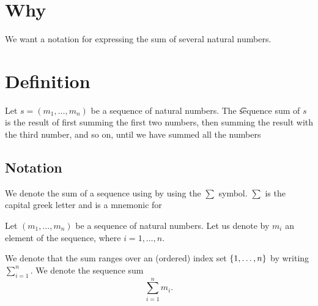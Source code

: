 

\section*{Why}

We want a notation for expressing the sum of several natural numbers.

\section*{Definition}

Let $s = (m_1, \dots , m_n)$ be a sequence of natural numbers. The \t{sequence sum} of $s$ is the result of first summing the first two numbers, then summing the result with the third number, and so on, until we have summed all the numbers

\subsection*{Notation}

We denote the sum of a sequence using by using the $\sum$ symbol. $\sum$ is the capital greek letter  and is a mnemonic for 

Let $(m_1, \dots , m_n)$ be a sequence of natural numbers.
Let us denote by $m_i$ an element of the sequence, where $i = 1, \dots , n$.

We denote that the sum ranges over an (ordered) index set $\{1, \dots , n\}$ by writing $\sum_{i = 1}^{n}$.
We denote the sequence sum
    \[
\sum_{i = 1}^{n} m_i.
    \]

\blankpage
